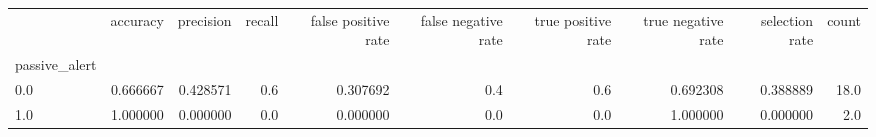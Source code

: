 \begin{tabular}{lrrrrrrrrr}
\toprule
{} &  accuracy &  precision &  recall &  false positive rate &  false negative rate &  true positive rate &  true negative rate &  selection rate &  count \\
passive\_alert &           &            &         &                      &                      &                     &                     &                 &        \\
\midrule
0.0           &  0.666667 &   0.428571 &     0.6 &             0.307692 &                  0.4 &                 0.6 &            0.692308 &        0.388889 &   18.0 \\
1.0           &  1.000000 &   0.000000 &     0.0 &             0.000000 &                  0.0 &                 0.0 &            1.000000 &        0.000000 &    2.0 \\
\bottomrule
\end{tabular}
